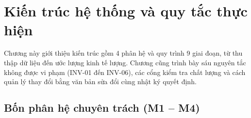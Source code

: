 
\chapter{Kiến trúc hệ thống và quy tắc thực hiện}
\label{chap:system_architecture}
\label{chap:architecture}

Chương này giới thiệu kiến trúc gồm 4 phân hệ và quy trình 9 giai đoạn, từ thu thập dữ liệu đến ước lượng kinh tế lượng. Chương cũng trình bày sáu nguyên tắc không được vi phạm (INV-01 đến INV-06), các cổng kiểm tra chất lượng và cách quản lý thay đổi bằng văn bản sửa đổi cùng nhật ký quyết định.

\section{Bốn phân hệ chuyên trách (M1 -- M4)}
\label{sec:system_modules}

